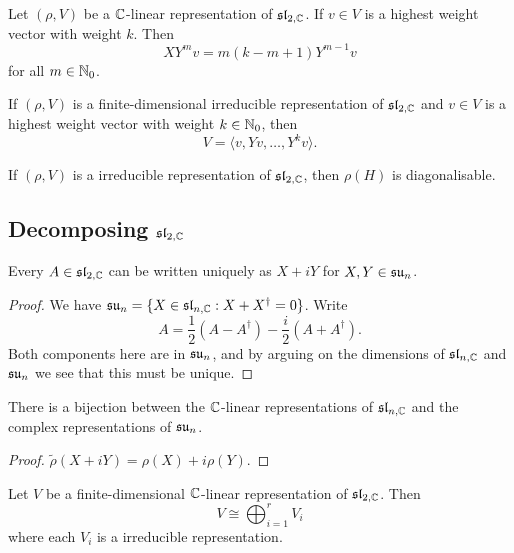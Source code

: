 \begin{lemma}
    Let $(\rho, V)$ be a $\C$-linear representation of $\sltwo$. If $v \in V$ is a highest weight vector with weight $k$. Then
    \[ XY^mv = m(k-m+1)Y^{m-1}v \]
    for all $m \in \N_0$.
\end{lemma}

\begin{lemma}
    If $(\rho, V)$ is a finite-dimensional irreducible representation of $\sltwo$ and $v \in V$ is a highest weight vector with weight $k \in \N_0$, then
    \[ V = \langle v, Yv, \ldots, Y^kv \rangle. \]
\end{lemma}

\begin{corollary}
    If $(\rho, V)$ is a irreducible representation of $\sltwo$, then $\rho(H)$ is diagonalisable.
\end{corollary}

\subsection{Decomposing $\sltwo$}

\begin{lemma}
    Every $A \in \sltwo$ can be written uniquely as $X + iY$ for $X, Y \in \su[n]$.
\end{lemma}

\begin{proof}
    We have $\su[n] = \{X \in \sl[n, \C]: X + X^\dagger = 0\}$. Write
    \[ A = \frac12(A - A^\dagger) - \frac i2(A + A^\dagger). \]
    Both components here are in $\su[n]$, and by arguing on the dimensions of $\sl[n, \C]$ and $\su[n]$ we see that this must be unique.
\end{proof}

\begin{lemma}
    There is a bijection between the $\C$-linear representations of $\sl[n, \C]$ and the complex representations of $\su[n]$.
\end{lemma}

\begin{proof}
    $\tilde\rho(X + iY) = \rho(X) + i\rho(Y)$.
\end{proof}

\begin{theorem}
    Let $V$ be a finite-dimensional $\C$-linear representation of $\sltwo$. Then
    \[ V \cong \bigoplus_{i=1}^r V_i\]
    where each $V_i$ is a irreducible representation.
\end{theorem}


